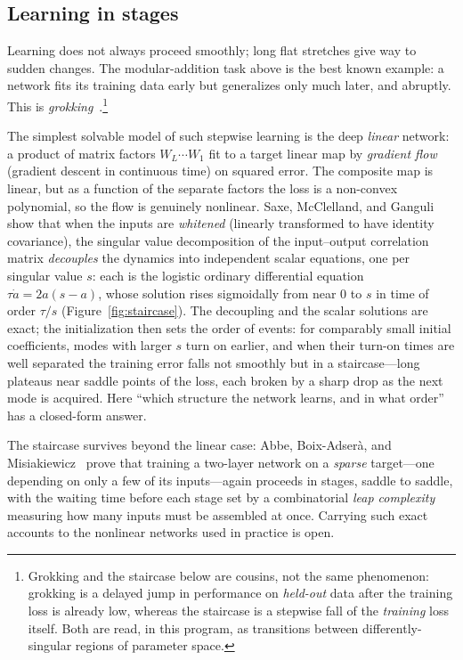 \subsection{Learning in stages}

Learning does not always proceed smoothly; long flat stretches give way to sudden changes. The modular-addition task above is the best known example: a network fits its training data early but generalizes only much later, and abruptly. This is \emph{grokking}~\cite{nanda2023}.\footnote{Grokking and the staircase below are cousins, not the same phenomenon: grokking is a delayed jump in performance on \emph{held-out} data after the training loss is already low, whereas the staircase is a stepwise fall of the \emph{training} loss itself. Both are read, in this program, as transitions between differently-singular regions of parameter space.}

The simplest solvable model of such stepwise learning is the deep \emph{linear} network: a product of matrix factors $W_L\cdots W_1$ fit to a target linear map by \emph{gradient flow} (gradient descent in continuous time) on squared error. The composite map is linear, but as a function of the separate factors the loss is a non-convex polynomial, so the flow is genuinely nonlinear. Saxe, McClelland, and Ganguli~\cite{saxe2014} show that when the inputs are \emph{whitened} (linearly transformed to have identity covariance), the singular value decomposition of the input--output correlation matrix \emph{decouples} the dynamics into independent scalar equations, one per singular value $s$: each is the logistic ordinary differential equation $\tau\dot a=2a(s-a)$, whose solution rises sigmoidally from near $0$ to $s$ in time of order $\tau/s$ (Figure~\ref{fig:staircase}). The decoupling and the scalar solutions are exact; the initialization then sets the order of events: for comparably small initial coefficients, modes with larger $s$ turn on earlier, and when their turn-on times are well separated the training error falls not smoothly but in a staircase---long plateaus near saddle points of the loss, each broken by a sharp drop as the next mode is acquired. Here ``which structure the network learns, and in what order'' has a closed-form answer.

The staircase survives beyond the linear case: Abbe, Boix-Adser\`a, and Misiakiewicz~\cite{abbe2023} prove that training a two-layer network on a \emph{sparse} target---one depending on only a few of its inputs---again proceeds in stages, saddle to saddle, with the waiting time before each stage set by a combinatorial \emph{leap complexity} measuring how many inputs must be assembled at once. Carrying such exact accounts to the nonlinear networks used in practice is open.

